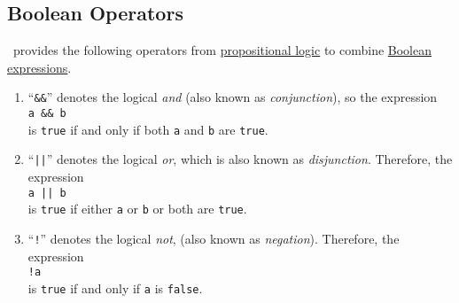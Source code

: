 \subsection{Boolean Operators}
\setlx\ provides the following operators from
\href{https://en.wikipedia.org/wiki/Propositional_calculus}{propositional logic} to combine 
\href{https://en.wikipedia.org/wiki/Boolean_expression}{Boolean expressions}. 
\begin{enumerate}
\item ``\texttt{\&\&}'' denotes the logical \emph{and} (also known as \emph{conjunction}), so the expression
      \\[0.2cm]
      \hspace*{1.3cm}
      \texttt{a \&\& b}
      \\[0.2cm]
      is \texttt{true} if and only if both \texttt{a} and \texttt{b} are \texttt{true}.
\item ``\texttt{||}'' denotes the logical \emph{or}, which is also known as \emph{disjunction}.
      Therefore,  the expression
      \\[0.2cm]
      \hspace*{1.3cm}
      \texttt{a || b}
      \\[0.2cm]
      is \texttt{true} if either \texttt{a} or \texttt{b} or both are \texttt{true}.  
\item ``\texttt{!}'' denotes the logical \emph{not}, (also known as \emph{negation}).
      Therefore, the expression
      \\[0.2cm]
      \hspace*{1.3cm}
      \texttt{!a}
      \\[0.2cm]
      is \texttt{true} if and only if \texttt{a} is \texttt{false}.  


\end{enumerate}
